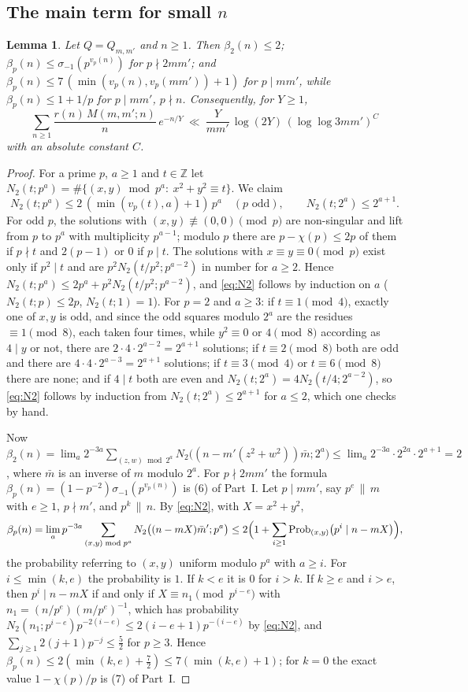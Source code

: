﻿\documentclass[11pt]{amsart}
\newtheorem{lemma}[theorem]{Lemma}
\theoremstyle{remark}
\newcommand{\Z}{\mathbb{Z}}
\begin{document}
\subsection{The main term for small $n$}
\begin{lemma}\label{lem:dens}
Let $Q=Q_{m,m'}$ and $n\ge1$. Then $\beta_2(n)\le2$; $\beta_p(n)\le\sigma_{-1}(p^{v_p(n)})$ for $p\nmid2mm'$; and $\beta_p(n)\le7\,(\min(v_p(n),v_p(mm'))+1)$ for $p\mid mm'$, while $\beta_p(n)\le1+1/p$ for $p\mid mm'$, $p\nmid n$. Consequently, for $Y\ge1$,
\[
\sum_{n\ge1}\frac{r(n)\,M(m,m';n)}{n}\,e^{-n/Y}\ \ll\ \frac{Y}{mm'}\,\log(2Y)\,(\log\log3mm')^{C}
\]
with an absolute constant $C$.
\end{lemma}
\begin{proof}
For a prime $p$, $a\ge1$ and $t\in\Z$ let $N_2(t;p^a)=\#\{(x,y)\bmod p^a:\ x^2+y^2\equiv t\}$. We claim
\begin{equation}\label{eq:N2}
N_2(t;p^a)\le2\,(\min(v_p(t),a)+1)\,p^a\quad(p\text{ odd}),\qquad N_2(t;2^a)\le2^{a+1}.
\end{equation}
For odd $p$, the solutions with $(x,y)\not\equiv(0,0)\pmod p$ are non-singular and lift from $p$ to $p^a$ with multiplicity $p^{a-1}$; modulo $p$ there are $p-\chi(p)\le2p$ of them if $p\nmid t$ and $2(p-1)$ or $0$ if $p\mid t$. The solutions with $x\equiv y\equiv0\pmod p$ exist only if $p^2\mid t$ and are $p^2N_2(t/p^2;p^{a-2})$ in number for $a\ge2$. Hence $N_2(t;p^a)\le2p^a+p^2N_2(t/p^2;p^{a-2})$, and \eqref{eq:N2} follows by induction on $a$ ($N_2(t;p)\le2p$, $N_2(t;1)=1$). For $p=2$ and $a\ge3$: if $t\equiv1\pmod4$, exactly one of $x,y$ is odd, and since the odd squares modulo $2^a$ are the residues $\equiv1\pmod8$, each taken four times, while $y^2\equiv0$ or $4\pmod8$ according as $4\mid y$ or not, there are $2\cdot4\cdot2^{a-2}=2^{a+1}$ solutions; if $t\equiv2\pmod8$ both are odd and there are $4\cdot4\cdot2^{a-3}=2^{a+1}$ solutions; if $t\equiv3\pmod4$ or $t\equiv6\pmod8$ there are none; and if $4\mid t$ both are even and $N_2(t;2^a)=4N_2(t/4;2^{a-2})$, so \eqref{eq:N2} follows by induction from $N_2(t;2^a)\le2^{a+1}$ for $a\le2$, which one checks by hand.

Now $\beta_2(n)=\lim_a2^{-3a}\sum_{(z,w)\bmod2^a}N_2\bigl((n-m'(z^2+w^2))\bar m;2^a\bigr)\le\lim_a2^{-3a}\cdot2^{2a}\cdot2^{a+1}=2$, where $\bar m$ is an inverse of $m$ modulo $2^a$. For $p\nmid2mm'$ the formula $\beta_p(n)=(1-p^{-2})\sigma_{-1}(p^{v_p(n)})$ is (6) of Part~I. Let $p\mid mm'$, say $p^e\,\|\,m$ with $e\ge1$, $p\nmid m'$, and $p^k\,\|\,n$. By \eqref{eq:N2}, with $X=x^2+y^2$,
\[
\beta_p(n)=\lim_ap^{-3a}\sum_{(x,y)\bmod p^a}N_2\bigl((n-mX)\bar m';p^a\bigr)\le2\Bigl(1+\sum_{i\ge1}\operatorname{Prob}_{(x,y)}\bigl(p^i\mid n-mX\bigr)\Bigr),
\]
the probability referring to $(x,y)$ uniform modulo $p^a$ with $a\ge i$. For $i\le\min(k,e)$ the probability is $1$. If $k<e$ it is $0$ for $i>k$. If $k\ge e$ and $i>e$, then $p^i\mid n-mX$ if and only if $X\equiv n_1\pmod{p^{i-e}}$ with $n_1=(n/p^e)(m/p^e)^{-1}$, which has probability $N_2(n_1;p^{i-e})p^{-2(i-e)}\le2(i-e+1)p^{-(i-e)}$ by \eqref{eq:N2}, and $\sum_{j\ge1}2(j+1)p^{-j}\le\frac52$ for $p\ge3$. Hence $\beta_p(n)\le2(\min(k,e)+\frac72)\le7(\min(k,e)+1)$; for $k=0$ the exact value $1-\chi(p)/p$ is (7) of Part~I.


\end{proof}
\end{document}
